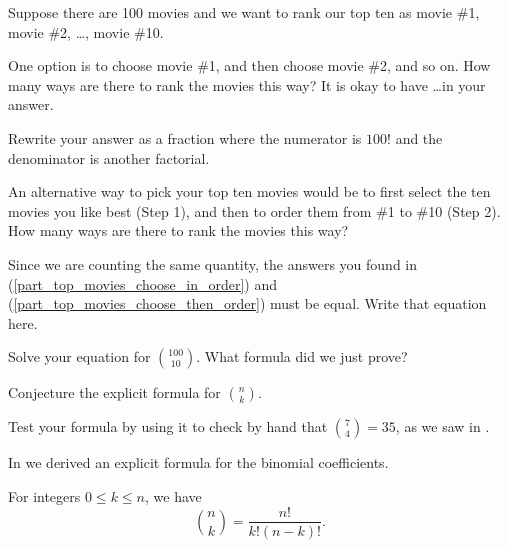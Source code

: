 \begin{act}
\label{act_formula_binom_coeffs}
    Suppose there are 100 movies and we want to rank our top ten as  movie \#1, movie \#2, \ldots, movie \#10.
        \begin{actpart}
            \item One option is to choose movie \#1, and then choose movie \#2, and so on.  How many ways are there to rank the movies this way?  It is okay to have \ldots in your answer.
            
            \item \label{part_top_movies_choose_in_order} Rewrite your answer as a fraction where the numerator is $100!$ and the denominator is another factorial.
            
            \item \label{part_top_movies_choose_then_order} An alternative way to pick your top ten movies would be to first select the ten movies you like best (Step 1), and then to order them from \#1 to \#10 (Step 2).  How many ways are there to rank the movies this way? 
            
            \item Since we are counting the same quantity, the answers you found in (\ref{part_top_movies_choose_in_order}) and (\ref{part_top_movies_choose_then_order}) must be equal.  Write that equation here.
            
            \item Solve your equation for $\binom{100}{10}$.  What formula did we just prove?

            \item Conjecture the explicit formula for $\binom{n}{k}$.
            
            \item Test your formula by using it to check by hand that $\binom{7}{4} = 35$, as we saw in .
        \end{actpart}
\end{act}

In  we derived an explicit formula for the binomial coefficients.

\begin{thm}
\label{thm_binom_coeffs_formula}
    For integers $0 \le k \le n$, we have
        $$\binom{n}{k} = \frac{n!}{k!(n-k)!}.$$  
\end{thm}

